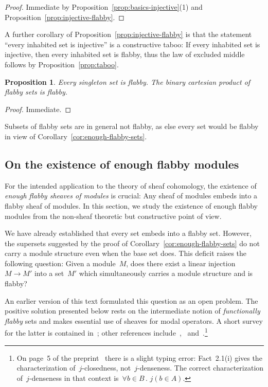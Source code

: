 \documentclass[oneside]{amsart}
\theoremstyle{definition}
\theoremstyle{plain}
\newtheorem{prop}[defn]{Proposition}
\theoremstyle{remark}
\renewcommand{\_}{\mathpunct{.}\,}
\begin{document}
\begin{proof}Immediate by Proposition~\ref{prop:basics-injective}(1) and
Proposition~\ref{prop:injective-flabby}.\end{proof}

A further corollary of Proposition~\ref{prop:injective-flabby} is that the
statement ``every inhabited set is injective'' is a constructive taboo: If every
inhabited set is injective, then every inhabited set is flabby, thus the law of
excluded middle follows by Proposition~\ref{prop:taboo}.

\begin{prop}Every singleton set is flabby. The binary cartesian product of flabby sets
is flabby.\end{prop}

\begin{proof}Immediate.\end{proof}

Subsets of flabby sets are in general not flabby, as else every set would be
flabby in view of Corollary~\ref{cor:enough-flabby-sets}.


\subsection{On the existence of enough flabby modules}

For the intended application to the theory of sheaf cohomology, the existence
of \emph{enough flabby sheaves of modules} is crucial: Any sheaf of modules
embeds into a flabby sheaf of modules. In this section, we study the existence
of enough flabby modules from the non-sheaf theoretic but constructive point of
view.

We have already established that every set embeds into a flabby set. However,
the supersets suggested by the proof of Corollary~\ref{cor:enough-flabby-sets}
do not carry a module structure even when the base set does. This deficit
raises the following question: Given a module~$M$, does there exist a linear
injection~$M \to M'$ into a set~$M'$ which simultaneously carries a module
structure and is flabby?

An earlier version of this text formulated this question as an open problem.
The positive solution presented below rests on the intermediate notion of
\emph{functionally flabby} sets and makes essential use of sheaves for modal
operators. A short survey for the latter is contained
in~\cite[Section~6]{blechschmidt:phd}; other references
include~\cite[Sections~14.4f.]{goldblatt:topoi},~\cite{goldblatt:modality}
\cite{vries:sheafification} and~\cite{fourman-scott:sheaves-and-logic}.\footnote{On page~5 of the
preprint~\cite{vries:sheafification} there is a slight typing error:
Fact~2.1(i) gives the characterization of~$j$-closedness, not~$j$-denseness.
The correct characterization of~$j$-denseness in that context is~$\forall b \in
B\_ j(b \in A)$.}
\end{document}
